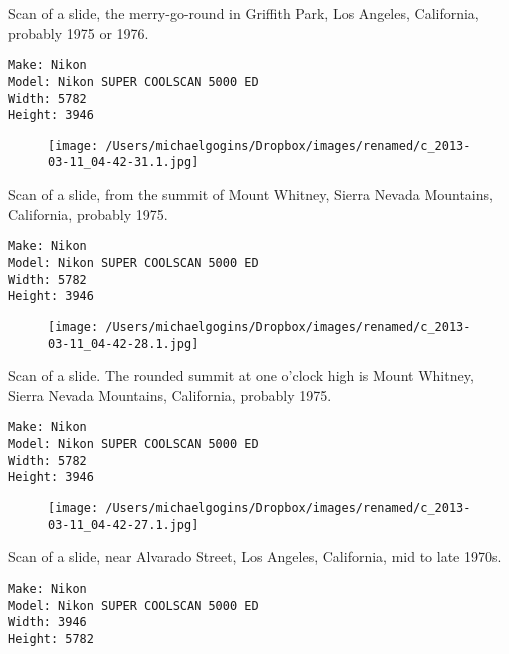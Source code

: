 \documentclass[11pt,letter,DIV=14,paper=landscape]{scrbook}
\begin{document}
\clearpage
\noindent Scan of a slide, the merry-go-round in Griffith Park, Los Angeles, California, probably 1975 or 1976.
\noindent
\begin{lstlisting}
Make: Nikon
Model: Nikon SUPER COOLSCAN 5000 ED
Width: 5782
Height: 3946
\end{lstlisting}
\clearpage

\begin{figure}
\texttt{[image: /Users/michaelgogins/Dropbox/images/renamed/c\_2013-03-11\_04-42-31.1.jpg]}
\end{figure}
    
\clearpage

\noindent Scan of a slide, from the summit of Mount Whitney, Sierra Nevada Mountains, California, probably 1975.
\noindent
\begin{lstlisting}
Make: Nikon
Model: Nikon SUPER COOLSCAN 5000 ED
Width: 5782
Height: 3946
\end{lstlisting}
\clearpage

\begin{figure}
\texttt{[image: /Users/michaelgogins/Dropbox/images/renamed/c\_2013-03-11\_04-42-28.1.jpg]}
\end{figure}
    
\clearpage
\noindent Scan of a slide. The rounded summit at one o'clock high is Mount Whitney, Sierra Nevada Mountains, California, probably 1975.
\noindent
\begin{lstlisting}
Make: Nikon
Model: Nikon SUPER COOLSCAN 5000 ED
Width: 5782
Height: 3946
\end{lstlisting}
\clearpage

\begin{figure}
\texttt{[image: /Users/michaelgogins/Dropbox/images/renamed/c\_2013-03-11\_04-42-27.1.jpg]}
\end{figure}
    
\clearpage
\noindent Scan of a slide, near Alvarado Street, Los Angeles, California, mid to late 1970s.
\noindent
\begin{lstlisting}
Make: Nikon
Model: Nikon SUPER COOLSCAN 5000 ED
Width: 3946
Height: 5782
\end{lstlisting}
\clearpage
\end{document}
